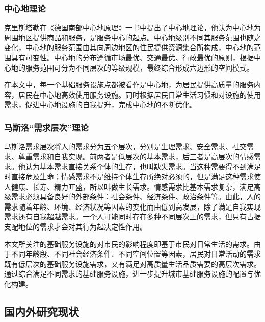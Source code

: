 \documentclass{shnuthesis}
\begin{document}
\subsubsection{中心地理论}

克里斯塔勒在《德国南部中心地原理》一书中提出了中心地理论，他认为中心地为周围地区提供商品和服务，是服务中心的起点。中心地级别不同其服务范围也随之变化，中心地的服务范围由其向周边地区的住民提供资源集合所构成，中心地的范围具有可变性。中心地的分布遵循市场最优、交通最优、行政最优的原则，根据中心地的服务范围可分为不同层次的等级规模，最终综合形成六边形的空间模式\textsuperscript{\cite{ma2021a}}。

在本文中，每一个基础服务设施点都被看作是中心地，为居民提供高质量的服务内容，居民在中心地高效使用服务设施。同时根据居民日常生活习惯和对设施的使用需求，促进中心地设施的自我提升，完成中心地的不断优化。

\subsubsection{马斯洛“需求层次”理论}

马斯洛需求层次将人的需求分为五个层次，分别是生理需求、安全需求、社交需求、尊重需求和自我实现。前两者是低层次的基本需求，后三者是高层次的情感需求。他认为基本需求直接关系个体的生存，也叫缺失需求。当这种需要得不到满足时直接危及生命；情感需求不是维持个体生存所绝对必须的，但是满足这种需求使人健康、长寿、精力旺盛，所以叫做生长需求。情感需求比基本需求复杂，满足高级需求必须具备良好的外部条件：社会条件、经济条件、政治条件等\textsuperscript{\cite{pengdanling2012}}。由此，人的需求随着年龄、环境、经济状况等因素的变化而由低到高发展，除了满足自我实现需求还有自我超越需求\textsuperscript{\cite{zhao2013}}。一个人可能同时存在多种不同层次上的需求，但只有占据支配地位的需求才会对其行为起决定性作用。

本文所关注的基础服务设施的对市民的影响程度即基于市民对日常生活的需求。由于不同年龄段、不同社会经济条件、不同空间位置等因素，居民对日常活动的需求既有低层次的基础服务设施需求，又有满足对高质量生活品质需要的高层次需求。通过综合满足不同需求的基础服务设施，进一步提升城市基础服务设施的配置与优化构建。

\subsection{国内外研究现状}
\end{document}
